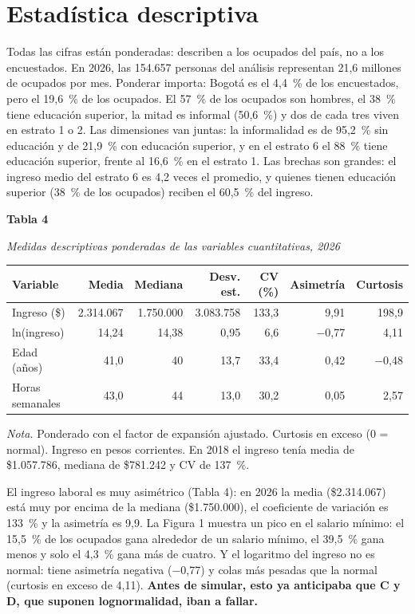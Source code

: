 \documentclass[12pt,letterpaper]{article}
\newcommand{\apa}[4]{%
  \singlespacing\raggedright
  {\bfseries #1\par}\vspace{0.4\baselineskip}
  {\itshape #2\par}\vspace{0.4\baselineskip}
  #3\par\vspace{0.3\baselineskip}
  {\small {\itshape Nota.} #4\par}}
\begin{document}
\section{Estadística descriptiva}

Todas las cifras están ponderadas: describen a los ocupados del país, no a los encuestados. En 2026, las 154.657 personas del análisis representan 21,6 millones de ocupados por mes. Ponderar importa: Bogotá es el 4,4~\% de los encuestados, pero el 19,6~\% de los ocupados. El 57~\% de los ocupados son hombres, el 38~\% tiene educación superior, la mitad es informal (50,6~\%) y dos de cada tres viven en estrato 1 o 2. Las dimensiones van juntas: la informalidad es de 95,2~\% sin educación y de 21,9~\% con educación superior, y en el estrato 6 el 88~\% tiene educación superior, frente al 16,6~\% en el estrato 1. Las brechas son grandes: el ingreso medio del estrato 6 es 4,2 veces el promedio, y quienes tienen educación superior (38~\% de los ocupados) reciben el 60,5~\% del ingreso.

\begin{table}[!htb]
\apa{Tabla 4}{Medidas descriptivas ponderadas de las variables cuantitativas, 2026}{%
  \small\renewcommand{\arraystretch}{1.0}
  \begin{tabular}{@{}lrrrrrr@{}}
    \toprule
    Variable & Media & Mediana & Desv. est. & CV (\%) & Asimetría & Curtosis \\
    \midrule
    Ingreso (\$)   & 2.314.067 & 1.750.000 & 3.083.758 & 133,3 & 9,91  & 198,9 \\
    ln(ingreso)    & 14,24     & 14,38     & 0,95      & 6,6   & $-$0,77 & 4,11 \\
    Edad (años)    & 41,0      & 40        & 13,7      & 33,4  & 0,42  & $-$0,48 \\
    Horas semanales& 43,0      & 44        & 13,0      & 30,2  & 0,05  & 2,57 \\
    \bottomrule
  \end{tabular}}{%
  Ponderado con el factor de expansión ajustado. Curtosis en exceso (0 = normal). Ingreso en pesos corrientes. En 2018 el ingreso tenía media de \$1.057.786, mediana de \$781.242 y CV de 137~\%.}
\end{table}

El ingreso laboral es muy asimétrico (Tabla 4): en 2026 la media (\$2.314.067) está muy por encima de la mediana (\$1.750.000), el coeficiente de variación es 133~\% y la asimetría es 9,9. La Figura 1 muestra un pico en el salario mínimo: el 15,5~\% de los ocupados gana alrededor de un salario mínimo, el 39,5~\% gana menos y solo el 4,3~\% gana más de cuatro. Y el logaritmo del ingreso no es normal: tiene asimetría negativa ($-$0,77) y colas más pesadas que la normal (curtosis en exceso de 4,11). \textbf{Antes de simular, esto ya anticipaba que C y D, que suponen lognormalidad, iban a fallar.}
\end{document}
